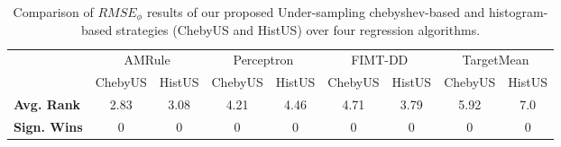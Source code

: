     \begin{table}[!htb]
        \centering
        \caption{Comparison of $RMSE_{\phi}$ results of our proposed Under-sampling chebyshev-based and histogram-based strategies (ChebyUS and HistUS) over four regression algorithms.}
        \label{tab:Sum_ChebyUS_HistUS_phi_Under}
        \begin{tabular}{ |l|c|c|c|c|c|c|c|c|}
        \hline
            \multirow{2}{4em}{ }&
            \multicolumn{2}{|c|}{AMRule} &
            \multicolumn{2}{|c|}{Perceptron} &
            \multicolumn{2}{|c|}{FIMT-DD} &
            \multicolumn{2}{|c|}{TargetMean}
        \\
        \cline{2-9}
        & ChebyUS & HistUS & ChebyUS & HistUS & ChebyUS & HistUS &
        ChebyUS & HistUS \\
        \hline
        {\bf Avg. Rank} & 2.83 & 3.08 & 4.21 & 4.46 & 4.71 & 3.79 & 5.92 & 7.0 \\
        \hline
        {\bf Sign. Wins} & 0 & 0 & 0 & 0 & 0 & 0 & 0 & 0 \\
        \hline
        \end{tabular}
    \end{table}